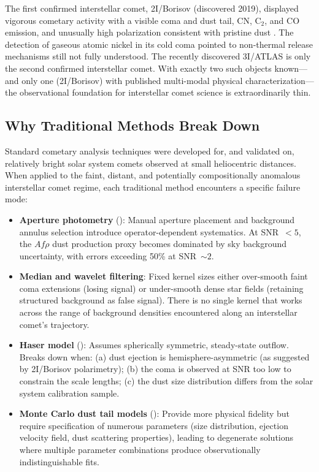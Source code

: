 \documentclass[preprint2]{aastex631}
\begin{document}
The first confirmed interstellar comet, 2I/Borisov (discovered 2019), displayed vigorous cometary activity with a visible coma and dust tail, CN, C$_2$, and CO emission, and unusually high polarization consistent with pristine dust \citep{guzik19,jewitt19,fitzsimmons19,bodewits20,bagnulo22}. The detection of gaseous atomic nickel in its cold coma \citep{guzik21} pointed to non-thermal release mechanisms still not fully understood. The recently discovered 3I/ATLAS \citep{atlas25} is only the second confirmed interstellar comet. With exactly two such objects known---and only one (2I/Borisov) with published multi-modal physical characterization---the observational foundation for interstellar comet science is extraordinarily thin.

\subsection{Why Traditional Methods Break Down}

Standard cometary analysis techniques were developed for, and validated on, relatively bright solar system comets observed at small heliocentric distances. When applied to the faint, distant, and potentially compositionally anomalous interstellar comet regime, each traditional method encounters a specific failure mode:

\begin{itemize}
    \item \textbf{Aperture photometry} (\citealt{lamy04}): Manual aperture placement and background annulus selection introduce operator-dependent systematics. At SNR~$< 5$, the $Af\rho$ dust production proxy \citep{ahearn95} becomes dominated by sky background uncertainty, with errors exceeding 50\% at SNR~$\sim 2$.
    \item \textbf{Median and wavelet filtering}: Fixed kernel sizes either over-smooth faint coma extensions (losing signal) or under-smooth dense star fields (retaining structured background as false signal). There is no single kernel that works across the range of background densities encountered along an interstellar comet's trajectory.
    \item \textbf{Haser model} (\citealt{haser57}): Assumes spherically symmetric, steady-state outflow. Breaks down when: (a) dust ejection is hemisphere-asymmetric (as suggested by 2I/Borisov polarimetry); (b) the coma is observed at SNR too low to constrain the scale lengths; (c) the dust size distribution differs from the solar system calibration sample.
    \item \textbf{Monte Carlo dust tail models} (\citealt{fulle10}): Provide more physical fidelity but require specification of numerous parameters (size distribution, ejection velocity field, dust scattering properties), leading to degenerate solutions where multiple parameter combinations produce observationally indistinguishable fits.
\end{itemize}
\end{document}
